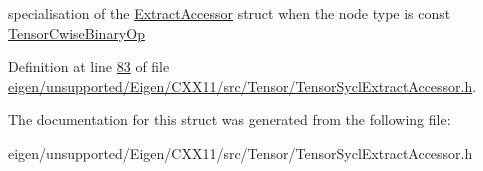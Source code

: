 specialisation of the \hyperlink{struct_eigen_1_1_tensor_sycl_1_1internal_1_1_extract_accessor}{Extract\+Accessor} struct when the node type is const \hyperlink{class_eigen_1_1_tensor_cwise_binary_op}{Tensor\+Cwise\+Binary\+Op} 

Definition at line \hyperlink{eigen_2unsupported_2_eigen_2_c_x_x11_2src_2_tensor_2_tensor_sycl_extract_accessor_8h_source_l00083}{83} of file \hyperlink{eigen_2unsupported_2_eigen_2_c_x_x11_2src_2_tensor_2_tensor_sycl_extract_accessor_8h_source}{eigen/unsupported/\+Eigen/\+C\+X\+X11/src/\+Tensor/\+Tensor\+Sycl\+Extract\+Accessor.\+h}.



The documentation for this struct was generated from the following file\+:\begin{DoxyCompactItemize}
\item 
eigen/unsupported/\+Eigen/\+C\+X\+X11/src/\+Tensor/\+Tensor\+Sycl\+Extract\+Accessor.\+h\end{DoxyCompactItemize}
